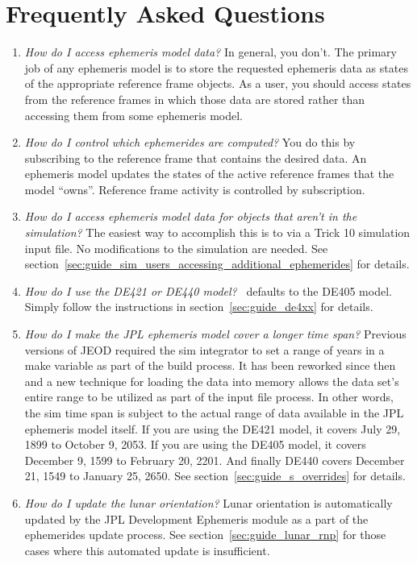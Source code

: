 \section{Frequently Asked Questions}
\label{sec:guide_FAQ}
\begin{enumerate}
\item \emph{How do I access ephemeris model data?}\newline
In general, you don't. The primary job of any ephemeris model is to store
the requested ephemeris data as  states of the appropriate reference frame
objects.
As a user, you should access states from the reference frames in which
those data are stored rather than accessing them from some ephemeris model.

\item \emph{How do I control which ephemerides are computed?}\newline
You do this by subscribing to the reference frame that contains the desired
data. An ephemeris model updates the states of the active reference frames
that the model ``owns''. Reference frame activity is controlled by
subscription.

\item \emph{How do I access ephemeris model data for objects
that aren't in the simulation?}\newline
The easiest way to accomplish this is to via a Trick 10 simulation input file.
No modifications to the simulation are needed.
See section~\ref{sec:guide_sim_users_accessing_additional_ephemerides}
for details.

\item \emph{How do I use the DE421 or DE440 model?}\newline
\JEODid\ defaults to the DE405 model. Simply follow the instructions in
section~\ref{sec:guide_de4xx} for details.

\item \emph{How do I make the JPL ephemeris model cover a longer time span?}
\newline
Previous versions of JEOD required the sim integrator to set a range of years in
a make variable as part of the build process. It has been reworked since then
and a new technique for loading the data into memory allows the data set's entire
range to be utilized as part of the input file process. In other words, 
the sim time span is subject to the actual range of data available in the JPL 
ephemeris model itself. If you are using the DE421 model, it covers July 29, 1899 to
October 9, 2053. If you are using the DE405 model, it covers December 9, 1599 to 
February 20, 2201. And finally DE440 covers December 21, 1549 to January 25, 2650.
See section~\ref{sec:guide_s_overrides} for details.

\item \emph{How do I update the lunar orientation?}\newline
Lunar orientation is automatically updated by the JPL Development Ephemeris
module as a part of the ephemerides update process.
See section~\ref{sec:guide_lunar_rnp} for those cases where this
automated update is insufficient.
\end{enumerate}
